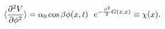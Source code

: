 \begin{equation}
\langle \frac{\partial^2 V}{\partial \phi^2} \rangle = \alpha_0 \cos \beta
\phi(x,t)
~~e^{- {\beta^2 \over 2} G(x,x)} \equiv \chi(x).
\end{equation}

